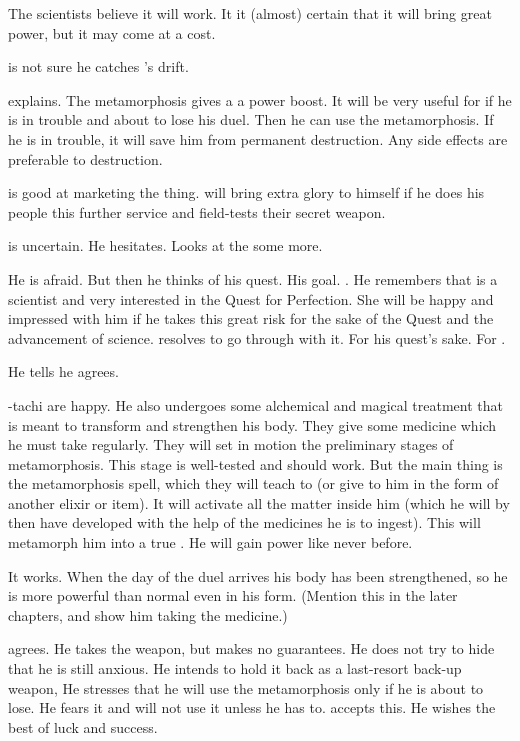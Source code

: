 The scientists believe it will work. 
It it (almost) certain that it will bring great power, but it may come at a cost. 

\Teshrial is not sure he catches \Azraid's drift. 

\Azraid explains.
The metamorphosis gives a \resphan a power boost. 
It will be very useful for \Teshrial if he is in trouble and about to lose his duel.
Then he can use the metamorphosis. 
If he is in trouble, it will save him from permanent destruction. 
Any side effects are preferable to destruction. 

\Azraid{} is good at marketing the thing. 
\Teshrial{} will bring extra glory to himself if he does his people this further service and field-tests their secret weapon. 



\begin{comment}
  \subsection{Teshrial considers and agrees}
\end{comment}

\Teshrial is uncertain.
He hesitates.
Looks at the \neoresphain some more.

He is afraid. 
But then he thinks of his quest.
His goal.
\Firaxel.
He remembers that \Firaxel is a scientist and very interested in the Quest for Perfection.
She will be happy and impressed with him if he takes this great risk for the sake of the Quest and the advancement of science.
\Teshrial resolves to go through with it. 
For his quest's sake. 
For \Firaxel. 

He tells \Azraid he agrees. 

\Azraid-tachi are happy.
He also undergoes some alchemical and magical treatment that is meant to transform and strengthen his body. 
They give \Teshrial some medicine which he must take regularly.
They will set in motion the preliminary stages of metamorphosis.
This stage is well-tested and should work. 
But the main thing is the metamorphosis spell, which they will teach to \Teshrial (or give to him in the form of another elixir or item). 
It will activate all the \neoresphan matter inside him (which he will by then have developed with the help of the medicines he is to ingest). 
This will metamorph him into a true \neoresphan. 
He will gain power like never before. 

It works. 
When the day of the duel arrives his body has been strengthened, so he is more powerful than normal even in his \resphan{} form. 
(Mention this in the later \Teshrial chapters, and show him taking the medicine.)

\Teshrial agrees. 
He takes the weapon, but makes no guarantees. 
He does not try to hide that he is still anxious. 
He intends to hold it back as a last-resort back-up weapon, 
He stresses that he will use the metamorphosis only if he is about to lose. 
He fears it and will not use it unless he has to. 
\Azraid accepts this. 
He wishes \Teshrial the best of luck and success. 





